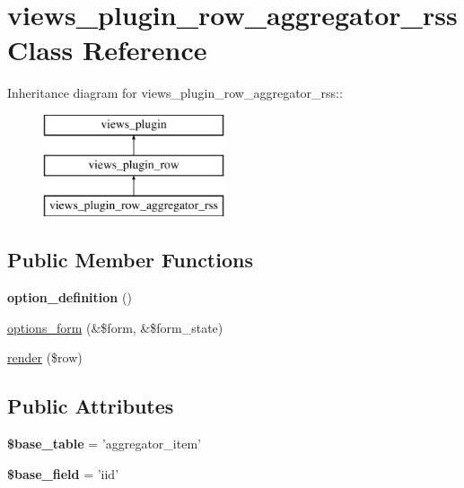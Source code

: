 \hypertarget{classviews__plugin__row__aggregator__rss}{
\section{views\_\-plugin\_\-row\_\-aggregator\_\-rss Class Reference}
\label{classviews__plugin__row__aggregator__rss}
}
Inheritance diagram for views\_\-plugin\_\-row\_\-aggregator\_\-rss::\begin{figure}[H]
\begin{center}
\leavevmode
\includegraphics[height=3cm]{classviews__plugin__row__aggregator__rss}
\end{center}
\end{figure}
\subsection*{Public Member Functions}
\begin{DoxyCompactItemize}
\item 
\hypertarget{classviews__plugin__row__aggregator__rss_a653e8ed46f98dbbc630b58bb7212f617}{
{\bfseries option\_\-definition} ()}
\label{classviews__plugin__row__aggregator__rss_a653e8ed46f98dbbc630b58bb7212f617}

\item 
\hyperlink{classviews__plugin__row__aggregator__rss_aa5c9bce3143901863f1a446b622fda9c}{options\_\-form} (\&\$form, \&\$form\_\-state)
\item 
\hyperlink{classviews__plugin__row__aggregator__rss_add4aa0892bf305556bb9a04c62da6027}{render} (\$row)
\end{DoxyCompactItemize}
\subsection*{Public Attributes}
\begin{DoxyCompactItemize}
\item 
\hypertarget{classviews__plugin__row__aggregator__rss_aa8d1c1a2d006e508b9548aab2c2efebf}{
{\bfseries \$base\_\-table} = 'aggregator\_\-item'}
\label{classviews__plugin__row__aggregator__rss_aa8d1c1a2d006e508b9548aab2c2efebf}

\item 
\hypertarget{classviews__plugin__row__aggregator__rss_a1f03be08be3bd0396061765b38ea62bc}{
{\bfseries \$base\_\-field} = 'iid'}
\label{classviews__plugin__row__aggregator__rss_a1f03be08be3bd0396061765b38ea62bc}

\end{DoxyCompactItemize}



